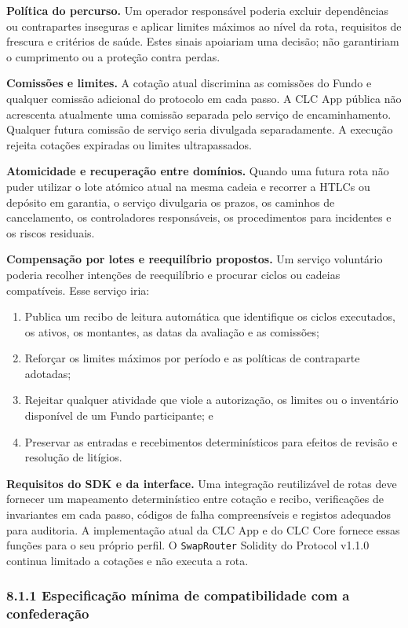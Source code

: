 \documentclass[11pt]{article}
\begin{document}
\textbf{Política do percurso.} Um operador responsável poderia excluir dependências ou contrapartes inseguras e aplicar limites máximos ao nível da rota, requisitos de frescura e critérios de saúde. Estes sinais apoiariam uma decisão; não garantiriam o cumprimento ou a proteção contra perdas.

\textbf{Comissões e limites.} A cotação atual discrimina as comissões do Fundo e qualquer comissão adicional do protocolo em cada passo. A CLC App pública não acrescenta atualmente uma comissão separada pelo serviço de encaminhamento. Qualquer futura comissão de serviço seria divulgada separadamente. A execução rejeita cotações expiradas ou limites ultrapassados.

\textbf{Atomicidade e recuperação entre domínios.} Quando uma futura rota não puder utilizar o lote atómico atual na mesma cadeia e recorrer a HTLCs ou depósito em garantia, o serviço divulgaria os prazos, os caminhos de cancelamento, os controladores responsáveis, os procedimentos para incidentes e os riscos residuais.

\textbf{Compensação por lotes e reequilíbrio propostos.} Um serviço voluntário poderia recolher intenções de reequilíbrio e procurar ciclos ou cadeias compatíveis. Esse serviço iria:

\begin{enumerate}[leftmargin=*]
\item Publica um recibo de leitura automática que identifique os ciclos executados, os ativos, os montantes, as datas da avaliação e as comissões;
\item Reforçar os limites máximos por período e as políticas de contraparte adotadas;
\item Rejeitar qualquer atividade que viole a autorização, os limites ou o inventário disponível de um Fundo participante; e
\item Preservar as entradas e recebimentos determinísticos para efeitos de revisão e resolução de litígios.
\end{enumerate}
\textbf{Requisitos do SDK e da interface.} Uma integração reutilizável de rotas deve fornecer um mapeamento determinístico entre cotação e recibo, verificações de invariantes em cada passo, códigos de falha compreensíveis e registos adequados para auditoria. A implementação atual da CLC App e do CLC Core fornece essas funções para o seu próprio perfil. O \texttt{SwapRouter} Solidity do Protocol v1.1.0 continua limitado a cotações e não executa a rota.

\subsubsection*{8.1.1 Especificação mínima de compatibilidade com a confederação}
\end{document}
